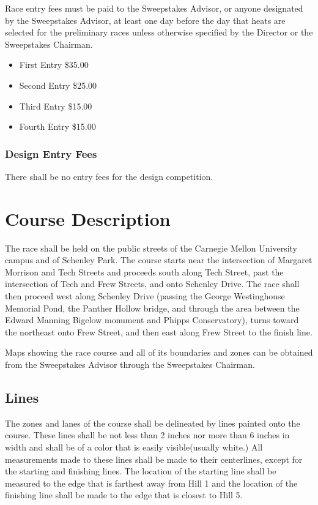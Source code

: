 \documentclass[openany]{book}
\begin{document}
Race entry fees must be paid to the Sweepstakes Advisor, or anyone designated by the Sweepstakes Advisor, at least one day before the day that heats are selected for the preliminary races unless otherwise specified by the Director or the Sweepstakes Chairman.

\begin{itemize}
	\item First Entry \$35.00
	\item Second Entry \$25.00
	\item Third Entry \$15.00
	\item Fourth Entry \$15.00
\end{itemize}

\subsection{Design Entry Fees}

There shall be no entry fees for the design competition.

\chapter{Course Description}

The race shall be held on the public streets of the Carnegie Mellon University campus and of Schenley Park. The course starts near the intersection of Margaret Morrison and Tech Streets and proceeds south along Tech Street, past the intersection of Tech and Frew Streets, and onto Schenley Drive. The race shall then proceed west along Schenley Drive (passing the George Westinghouse Memorial Pond, the Panther Hollow bridge, and through the area between the Edward Manning Bigelow monument and Phipps Conservatory), turns toward the northeast onto Frew Street, and then east along Frew Street to the finish line.

Maps showing the race course and all of its boundaries and zones can be obtained from the Sweepstakes Advisor through the Sweepstakes Chairman.

\section{Lines}

The zones and lanes of the course shall be delineated by lines painted onto the course. These lines shall be not less than 2 inches nor more than 6 inches in width and shall be of a color that is easily visible(usually white.) All measurements made to these lines shall be made to their centerlines, except for the starting and finishing lines. The location of the starting line shall be measured to the edge that is farthest away from Hill 1 and the location of the finishing line shall be made to the edge that is closest to Hill 5.
\end{document}
